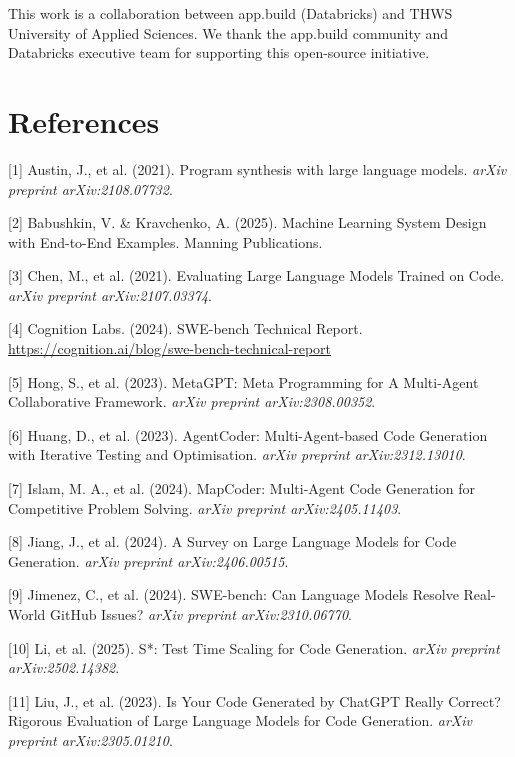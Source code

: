 \documentclass{article}
\begin{document}
This work is a collaboration between app.build (Databricks) and THWS University of Applied Sciences. We thank the app.build community and Databricks executive team for supporting this open-source initiative.

\section*{References}


\small

[1] Austin, J., et al. (2021). Program synthesis with large language models. \textit{arXiv preprint arXiv:2108.07732}.

[2] Babushkin, V. \& Kravchenko, A. (2025). Machine Learning System Design with End-to-End Examples. Manning Publications.

[3] Chen, M., et al. (2021). Evaluating Large Language Models Trained on Code. \textit{arXiv preprint arXiv:2107.03374}.

[4] Cognition Labs. (2024). SWE-bench Technical Report. \url{https://cognition.ai/blog/swe-bench-technical-report}

[5] Hong, S., et al. (2023). MetaGPT: Meta Programming for A Multi-Agent Collaborative Framework. \textit{arXiv preprint arXiv:2308.00352}.

[6] Huang, D., et al. (2023). AgentCoder: Multi-Agent-based Code Generation with Iterative Testing and Optimisation. \textit{arXiv preprint arXiv:2312.13010}.

[7] Islam, M. A., et al. (2024). MapCoder: Multi-Agent Code Generation for Competitive Problem Solving. \textit{arXiv preprint arXiv:2405.11403}.

[8] Jiang, J., et al. (2024). A Survey on Large Language Models for Code Generation. \textit{arXiv preprint arXiv:2406.00515}.

[9] Jimenez, C., et al. (2024). SWE-bench: Can Language Models Resolve Real-World GitHub Issues? \textit{arXiv preprint arXiv:2310.06770}.

[10] Li, et al. (2025). S*: Test Time Scaling for Code Generation. \textit{arXiv preprint arXiv:2502.14382}.

[11] Liu, J., et al. (2023). Is Your Code Generated by ChatGPT Really Correct? Rigorous Evaluation of Large Language Models for Code Generation. \textit{arXiv preprint arXiv:2305.01210}.
\end{document}
